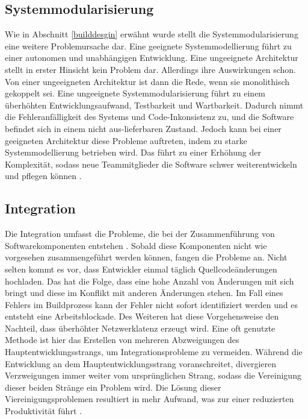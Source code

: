 \subsection{Systemmodularisierung}  \label{Systemmodularisierung}
Wie in Abschnitt \ref{builddesgin} erwähnt wurde stellt die Systemmodularisierung eine weitere Problemursache dar. Eine geeignete Systemmodellierung führt zu einer autonomen und unabhängigen Entwicklung. Eine ungeeignete Architektur stellt in erster Hinsicht kein Problem dar. Allerdings ihre Auswirkungen schon. Von einer ungeeigneten Architektur ist dann die Rede, wenn sie monolithisch gekoppelt sei. Eine ungeeignete Systemmodularisierung führt zu einem überhöhten Entwicklungsaufwand, Testbarkeit und Wartbarkeit. Dadurch nimmt die Fehleranfälligkeit des Systems und Code-Inkonsistenz zu, und die Software befindet sich in einem nicht aus-lieferbaren Zustand. Jedoch kann bei einer geeigneten Architektur diese Probleme auftreten, indem zu starke Systemmodellierung betrieben wird. Das führt zu einer Erhöhung der Komplexität, sodass neue Teammitglieder die Software schwer weiterentwickeln und pflegen können \cite{Laukkanen.2017}. 

\subsection{Integration} \label{Integration}
Die Integration umfasst die Probleme, die bei der Zusammenführung von Softwarekomponenten entstehen \cite{LianpingEtPaddy.2015}. Sobald diese Komponenten nicht wie vorgesehen zusammengeführt werden können, fangen die Probleme an. Nicht selten kommt es vor, dass Entwickler einmal täglich Quellcodeänderungen hochladen. Das hat die Folge, dass eine hohe Anzahl von Änderungen mit sich bringt und diese im Konflikt mit anderen Änderungen stehen. Im Fall eines Fehlers im Buildprozess kann der Fehler nicht sofort identifiziert werden und es entsteht eine Arbeitsblockade. Des Weiteren hat diese Vorgehensweise den Nachteil, dass überhöhter Netzwerklatenz erzeugt wird. Eine oft genutzte Methode ist hier das Erstellen von mehreren Abzweigungen des Hauptentwicklungsstrangs, um Integrationsprobleme zu vermeiden. Während die Entwicklung an dem Hauptentwicklungsstrang voranschreitet, divergieren Verzweigungen immer weiter vom ursprünglichen Strang, sodass die Vereinigung dieser beiden Stränge ein Problem wird. Die Lösung dieser Viereinigungsproblemen resultiert in mehr Aufwand, was zur einer reduzierten Produktivität führt \cite{Laukkanen.2017}. 


